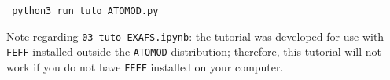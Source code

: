 \documentclass[12pt,a4paper,french]{book}
\begin{document}
\verb+ python3 run_tuto_ATOMOD.py+

Note regarding \verb+03-tuto-EXAFS.ipynb+: the tutorial was developed for use with \verb+FEFF+ installed outside the \verb+ATOMOD+ distribution; therefore, this tutorial will not work if you do not have \verb+FEFF+ installed on your computer.


 
%
\end{document}
